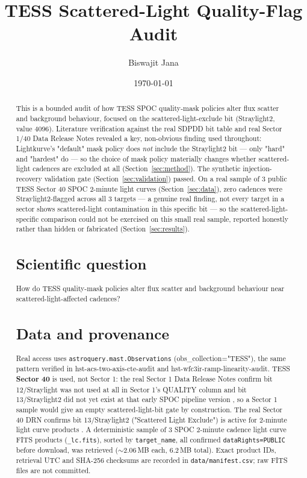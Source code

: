 \documentclass[11pt]{article}
\title{TESS Scattered-Light Quality-Flag Audit}
\author{Biswajit Jana}
\date{\today}
\begin{document}
\maketitle

\begin{abstract}
This is a bounded audit of how TESS SPOC quality-mask policies alter flux
scatter and background behaviour, focused on the scattered-light-exclude bit
(Straylight2, value 4096). Literature verification against the real SDPDD
bit table and real Sector 1/40 Data Release Notes revealed a key, non-obvious
finding used throughout: Lightkurve's "default" mask policy does
\emph{not} include the Straylight2 bit --- only "hard" and "hardest" do
--- so the choice of mask policy materially changes whether scattered-light
cadences are excluded at all (Section~\ref{sec:method}). The synthetic
injection-recovery validation gate (Section~\ref{sec:validation}) passed. On
a real sample of 3 public TESS Sector 40 SPOC 2-minute light curves
(Section~\ref{sec:data}), zero cadences were Straylight2-flagged across all
3 targets --- a genuine real finding, not every target in a sector shows
scattered-light contamination in this specific bit --- so the
scattered-light-specific comparison could not be exercised on this small
real sample, reported honestly rather than hidden or fabricated
(Section~\ref{sec:results}).

\section{Scientific question}
How do TESS quality-mask policies alter flux scatter and background
behaviour near scattered-light-affected cadences?

\section{Data and provenance}
\label{sec:data}
Real access uses \texttt{astroquery.mast.Observations} (obs\_collection="TESS"),
the same pattern verified in hst-acs-two-axis-cte-audit and
hst-wfc3ir-ramp-linearity-audit. TESS \textbf{Sector 40} is used, not Sector
1: the real Sector 1 Data Release Notes confirm bit 12/Straylight was not
used at all in Sector 1's QUALITY column and bit 13/Straylight2 did not yet
exist at that early SPOC pipeline version \citep{TESSSector1DRN}, so a
Sector 1 sample would give an empty scattered-light-bit gate by
construction. The real Sector 40 DRN confirms bit 13/Straylight2
("Scattered Light Exclude") is active for 2-minute light curve products
\citep{TESSSector40DRN}. A deterministic sample of 3 SPOC 2-minute cadence
light curve FITS products (\texttt{\_lc.fits}), sorted by \texttt{target\_name},
all confirmed \texttt{dataRights=PUBLIC} before download, was retrieved
($\sim$2.06\,MB each, 6.2\,MB total). Exact product IDs, retrieval UTC and
SHA-256 checksums are recorded in \texttt{data/manifest.csv}; raw FITS files
are not committed.


\end{abstract}
\end{document}
